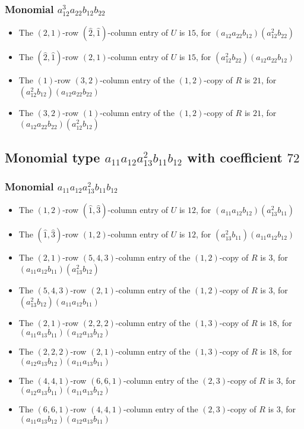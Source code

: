 \documentclass{article}
\begin{document}
\subsubsection{Monomial $ a_{12}^{3} a_{22} b_{12} b_{22} $}

\begin{itemize}
\item The $ \left(2, 1\right) $-row $ (\hat{2}, \hat{1}) $-column entry of $U$ is $ 15 $, for $( a_{12} a_{22} b_{12} )( a_{12}^{2} b_{22} )$ 
\item The $(\hat{2}, \hat{1})$-row $ \left(2, 1\right) $-column entry of $U$ is $ 15 $, for $( a_{12}^{2} b_{22} )( a_{12} a_{22} b_{12} )$ 
\item The $(1)$-row $(3, 2)$-column entry of the $ \left(1, 2\right) $-copy of $R$ is $ 21 $, for $( a_{12}^{2} b_{12} )( a_{12} a_{22} b_{22} )$ 
\item The $(3, 2)$-row $(1)$-column entry of the $ \left(1, 2\right) $-copy of $R$ is $ 21 $, for $( a_{12} a_{22} b_{22} )( a_{12}^{2} b_{12} )$ 
\end{itemize}
\subsection{Monomial type $ a_{11} a_{12} a_{13}^{2} b_{11} b_{12} $ with coefficient $ 72 $}

\subsubsection{Monomial $ a_{11} a_{12} a_{13}^{2} b_{11} b_{12} $}

\begin{itemize}
\item The $ \left(1, 2\right) $-row $ (\hat{1}, \hat{3}) $-column entry of $U$ is $ 12 $, for $( a_{11} a_{12} b_{12} )( a_{13}^{2} b_{11} )$ 
\item The $(\hat{1}, \hat{3})$-row $ \left(1, 2\right) $-column entry of $U$ is $ 12 $, for $( a_{13}^{2} b_{11} )( a_{11} a_{12} b_{12} )$ 
\item The $(2, 1)$-row $(5, 4, 3)$-column entry of the $ \left(1, 2\right) $-copy of $R$ is $ 3 $, for $( a_{11} a_{12} b_{11} )( a_{13}^{2} b_{12} )$ 
\item The $(5, 4, 3)$-row $(2, 1)$-column entry of the $ \left(1, 2\right) $-copy of $R$ is $ 3 $, for $( a_{13}^{2} b_{12} )( a_{11} a_{12} b_{11} )$ 
\item The $(2, 1)$-row $(2, 2, 2)$-column entry of the $ \left(1, 3\right) $-copy of $R$ is $ 18 $, for $( a_{11} a_{13} b_{11} )( a_{12} a_{13} b_{12} )$ 
\item The $(2, 2, 2)$-row $(2, 1)$-column entry of the $ \left(1, 3\right) $-copy of $R$ is $ 18 $, for $( a_{12} a_{13} b_{12} )( a_{11} a_{13} b_{11} )$ 
\item The $(4, 4, 1)$-row $(6, 6, 1)$-column entry of the $ \left(2, 3\right) $-copy of $R$ is $ 3 $, for $( a_{12} a_{13} b_{11} )( a_{11} a_{13} b_{12} )$ 
\item The $(6, 6, 1)$-row $(4, 4, 1)$-column entry of the $ \left(2, 3\right) $-copy of $R$ is $ 3 $, for $( a_{11} a_{13} b_{12} )( a_{12} a_{13} b_{11} )$ 
\end{itemize}
\end{document}
